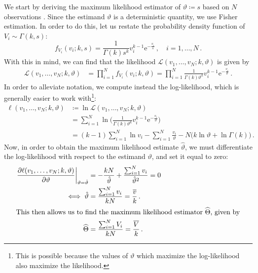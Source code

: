 \documentclass[final]{aomart}
\newtheorem[{}\it]{thm}{Theorem}[section]
\theoremstyle{definition}
\newtheorem*[{}\it]{notation}{Notation}
\numberwithin{equation}{section}
\newcommand{\wh}{\widehat}
\renewcommand{\theta}{\vartheta}
\newcommand{\like}{\mathcal{L}} %
\newcommand{\e}{\mathrm{e}} %
\newcommand{\pdf}{f} %
\newcommand{\htheta}{\hat{\theta}} %
\newcommand{\hTheta}{\wh{\Theta}} %
\newcommand{\eval}[2][\right]{\relax
  \ifx#1\right\relax \left.\fi#2#1\rvert}
\begin{document}
We start by deriving the maximum likelihood estimator of \(\theta \coloneqq s\) based on \(N\) observations \cite{wiki:mle}.
Since the estimand $\theta$ is a deterministic quantity, we use Fisher estimation.
In order to do this, let us restate the probability density function of \(V_i \sim \Gamma(k, s)\):
\begin{equation}
\pdf_{V_i}(v_i; k, s) = \frac{1}{\Gamma(k) s^k} v_i^{k-1} \e^{-\frac{v_i}{s}}\,, \quad i = 1, \ldots, N\,.\label{eq:gamma}
\end{equation}
With this in mind, we can find that the likelihood \(\like(v_1, \ldots, v_N; k, \theta)\) is given by
\begin{align}
\like(v_1, \ldots, v_N; k, \theta) &= \prod_{i=1}^{N} \pdf_{V_i}(v_i; k,\theta) = \prod_{i=1}^{N} \frac{1}{\Gamma(k) \theta^k} v_i^{k-1} \e^{-\frac{v_i}{\theta}}\,.
\end{align}
In order to alleviate notation, we compute instead the log-likelihood, which is generally easier to work with\footnote{This is possible because the values of \(\theta\) which maximize the log-likelihood also maximize the likelihood.}:
\begin{align}
\ell(v_1, \ldots, v_N; k, \theta) &\coloneqq \ln \like(v_1, \ldots, v_N; k, \theta)\\
&= \sum_{i=1}^{N} \ln\Bigg(\frac{1}{\Gamma(k) \theta^k} v_i^{k-1} \e^{-\frac{v_i}{\theta}}\Bigg)\\
&= (k-1) \sum_{i=1}^{N}\ln v_i - \sum_{i=1}^{N} \frac{v_i}{\theta} - N \big(k \ln \theta + \ln \Gamma(k)\big)\,.\label{eq:loglikelihood}
\end{align}
Now, in order to obtain the maximum likelihood estimate \(\htheta\), we must differentiate the log-likelihood with respect to the estimand \(\theta\), and set it equal to zero:
\begin{align}
\eval{\frac{\partial \ell(v_1, \ldots, v_N; k, \theta)}{\partial \theta}}_{\theta = \htheta} &= -\frac{kN}{\htheta} + \frac{\sum_{i=1}^{N} v_i}{\htheta^2} = 0\\
\iff \htheta &= \frac{\sum_{i=1}^{N} v_i}{kN} = \frac{\widebar{v}}{k}\,.\\
\intertext{This then allows us to find the maximum likelihood estimator \(\hTheta\), given by}
\hTheta &= \frac{\sum_{i=1}^{N} V_i}{kN} = \frac{\widebar{V}}{k}\,.\label{eq:mlestimator}
\end{align}
\end{document}
